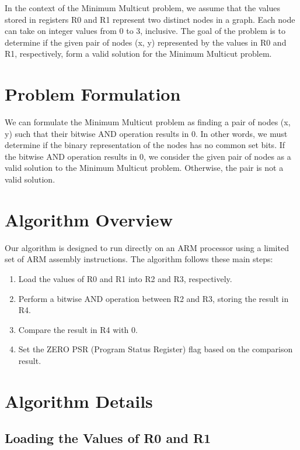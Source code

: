 In the context of the Minimum Multicut problem, we assume that the values stored in registers R0 and R1 represent two distinct nodes in a graph. Each node can take on integer values from 0 to 3, inclusive. The goal of the problem is to determine if the given pair of nodes (x, y) represented by the values in R0 and R1, respectively, form a valid solution for the Minimum Multicut problem.

\section{Problem Formulation}

We can formulate the Minimum Multicut problem as finding a pair of nodes (x, y) such that their bitwise AND operation results in 0. In other words, we must determine if the binary representation of the nodes has no common set bits. If the bitwise AND operation results in 0, we consider the given pair of nodes as a valid solution to the Minimum Multicut problem. Otherwise, the pair is not a valid solution.

\section{Algorithm Overview}

Our algorithm is designed to run directly on an ARM processor using a limited set of ARM assembly instructions. The algorithm follows these main steps:

\begin{enumerate}
    \item Load the values of R0 and R1 into R2 and R3, respectively.
    \item Perform a bitwise AND operation between R2 and R3, storing the result in R4.
    \item Compare the result in R4 with 0.
    \item Set the ZERO PSR (Program Status Register) flag based on the comparison result.
\end{enumerate}

\section{Algorithm Details}

\subsection{Loading the Values of R0 and R1}

